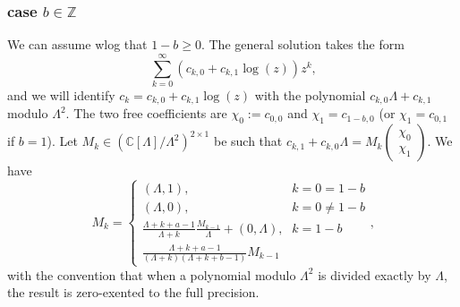 \documentclass[12pt]{article}
\newcommand{\bbC}[0]  { \mathbb{C}}
\newcommand{\bbZ}[0]  { \mathbb{Z}}
\numberwithin{equation}{section}
\begin{document}
\subsubsection{case $b \in \bbZ$}
We can assume wlog that $1-b \ge 0$. The general solution takes the form
\begin{equation*}
\sum_{k=0}^{\infty} (c_{k,0}+c_{k,1} \log(z)) z^k\text{,}
\end{equation*}
and we will identify $c_k = c_{k,0}+c_{k,1} \log(z)$ with the polynomial $c_{k,0} \Lambda + c_{k,1}$ modulo $\Lambda^2$. The two free coefficients are $\chi_0 := c_{0,0}$ and $\chi_1 = c_{1-b,0}$ (or $\chi_1 = c_{0,1}$ if $b=1$). Let $M_k \in (\bbC[\Lambda]/\Lambda^2)^{2 \times 1}$ be such that $c_{k,1} + c_{k,0} \Lambda = M_k (\begin{smallmatrix} \chi_0 \\ \chi_1\end{smallmatrix})$. We have
\begin{equation*}
M_k = \begin{cases}
(\Lambda, 1)\text{,} & k=0=1-b\\
(\Lambda, 0)\text{,} & k=0 \ne 1-b\\
\frac{\Lambda+k+a-1}{\Lambda+k} \frac{M_{k-1}}{\Lambda} + (0,\Lambda)\text{,} & k=1-b\\
\frac{\Lambda+k+a-1}{(\Lambda+k)(\Lambda+k+b-1)} M_{k-1}
\end{cases}
\text{,}
\end{equation*}
with the convention that when a polynomial modulo $\Lambda^2$ is divided exactly by $\Lambda$, the result is zero-exented to the full precision.
\end{document}
